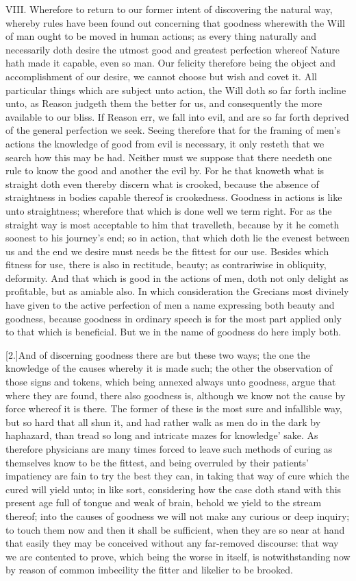 VIII. Wherefore to return to our former intent of discovering the natural way, whereby rules have been found out concerning that goodness wherewith the Will of man ought to be moved in human actions; as every thing naturally and necessarily doth desire the utmost good and greatest perfection whereof Nature hath made it capable, even so man. Our felicity therefore being the object and accomplishment of our desire, we cannot choose but wish and covet it. All particular things which are subject unto action, the Will doth so far forth incline unto, as Reason judgeth them the better for us, and consequently the more available to our bliss. If Reason err, we fall into evil, and are so far forth deprived of the general perfection we seek. Seeing therefore that for the framing of men’s actions the knowledge of good from evil is necessary, it only resteth that we search how this may be had. Neither must we suppose that there needeth one rule to know the good and another the evil by. For he that knoweth what is straight doth even thereby discern what is crooked, because the absence of straightness in bodies capable thereof is crookedness. Goodness in actions is like unto straightness; wherefore that which is done well we term right. For as the straight way is most acceptable to him that travelleth, because by it he cometh soonest to his journey’s end; so in action, that which doth lie the evenest between us and the end we desire must needs be the fittest for our use. Besides which fitness for use, there is also in rectitude, beauty; as contrariwise in obliquity, deformity. And that which is good in the actions of men, doth not only delight as profitable, but as amiable also. In which consideration the Grecians most divinely have given to the active perfection of  men a name expressing both beauty and goodness, because goodness in ordinary speech is for the most part applied only to that which is beneficial. But we in the name of goodness do here imply both.

[2.]And of discerning goodness there are but these two ways; the one the knowledge of the causes whereby it is made such; the other the observation of those signs and tokens, which being annexed always unto goodness, argue that where they are found, there also goodness is, although we know not the cause by force whereof it is there. The former of these is the most sure and infallible way, but so hard that all shun it, and had rather walk as men do in the dark by haphazard, than tread so long and intricate mazes for knowledge’ sake. As therefore physicians are many times forced to leave such methods of curing as themselves know to be the fittest, and being overruled by their patients’ impatiency are fain to try the best they can, in taking that way of cure which the cured will yield unto; in like sort, considering how the case doth stand with this present age full of tongue and weak of brain, behold we yield to the stream thereof; into the causes of goodness we will not make any curious or deep inquiry; to touch them now and then it shall be sufficient, when they are so near at hand that easily they may be conceived without any far-removed discourse: that way we are contented to prove, which being the worse in itself, is notwithstanding now by reason of common imbecility the fitter and likelier to be brooked.

